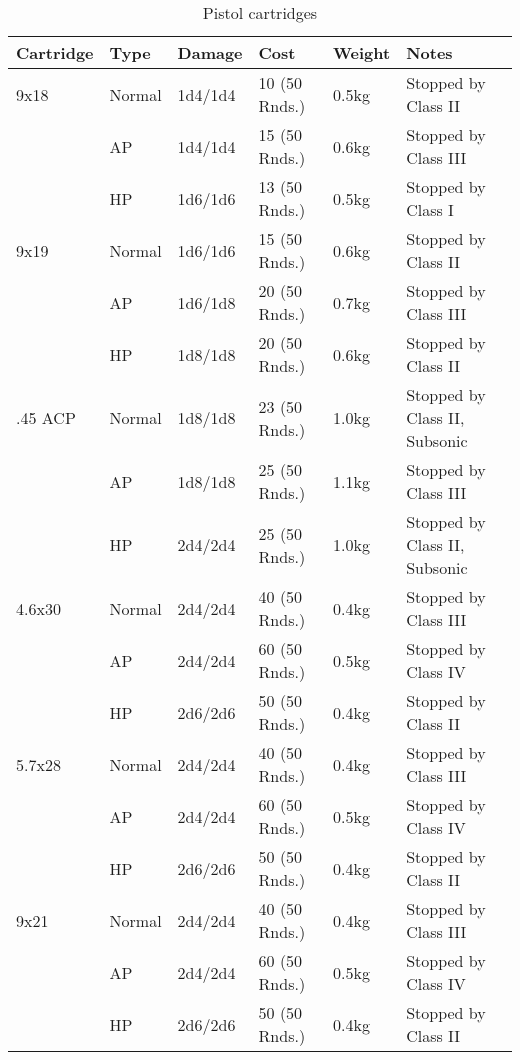 \begin{table}
  \caption{Pistol cartridges}
  \label{tab:PistolCartridges}
  \begin{center}
    \begin{tabular}{| l | l | l | l | l | l |}
      \hline
      \textbf{Cartridge}  & \textbf{Type}   & \textbf{Damage} &
      \textbf{Cost} & \textbf{Weight} & \textbf{Notes} \\ \hline

      9x18    & Normal & 1d4/1d4  & 10 (50 Rnds.) & 0.5kg & Stopped by Class II \\ \hline
      \,      & AP     & 1d4/1d4  & 15 (50 Rnds.) & 0.6kg & Stopped by Class III \\ \hline
      \,      & HP     & 1d6/1d6  & 13 (50 Rnds.) & 0.5kg & Stopped by Class I \\ \hline
      9x19    & Normal & 1d6/1d6  & 15 (50 Rnds.) & 0.6kg & Stopped by Class II \\ \hline
      \,      & AP     & 1d6/1d8  & 20 (50 Rnds.) & 0.7kg & Stopped by Class III \\ \hline
      \,      & HP     & 1d8/1d8  & 20 (50 Rnds.) & 0.6kg & Stopped by Class II \\ \hline
      .45 ACP & Normal & 1d8/1d8  & 23 (50 Rnds.) & 1.0kg & Stopped by Class II, Subsonic \\ \hline
      \,      & AP     & 1d8/1d8  & 25 (50 Rnds.) & 1.1kg & Stopped by Class III \\ \hline
      \,      & HP     & 2d4/2d4  & 25 (50 Rnds.) & 1.0kg & Stopped by Class II, Subsonic \\ \hline
      4.6x30  & Normal & 2d4/2d4  & 40 (50 Rnds.) & 0.4kg & Stopped by Class III \\ \hline
      \,      & AP     & 2d4/2d4  & 60 (50 Rnds.) & 0.5kg & Stopped by Class IV \\ \hline
      \,      & HP     & 2d6/2d6  & 50 (50 Rnds.) & 0.4kg & Stopped by Class II \\ \hline
      5.7x28  & Normal & 2d4/2d4  & 40 (50 Rnds.) & 0.4kg & Stopped by Class III \\ \hline
      \,      & AP     & 2d4/2d4  & 60 (50 Rnds.) & 0.5kg & Stopped by Class IV \\ \hline
      \,      & HP     & 2d6/2d6  & 50 (50 Rnds.) & 0.4kg & Stopped by Class II \\ \hline
      9x21    & Normal & 2d4/2d4  & 40 (50 Rnds.) & 0.4kg & Stopped by Class III \\ \hline
      \,      & AP     & 2d4/2d4  & 60 (50 Rnds.) & 0.5kg & Stopped by Class IV \\ \hline
      \,      & HP     & 2d6/2d6  & 50 (50 Rnds.) & 0.4kg & Stopped by Class II \\ \hline

    \end{tabular}
  \end{center}
\end{table}

